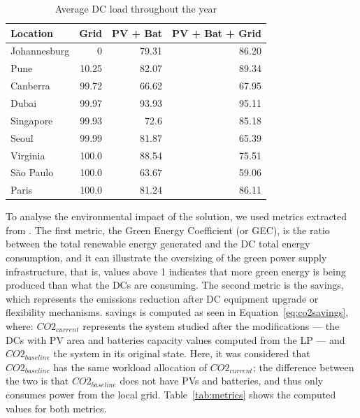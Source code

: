 \begin{table}[!ht]
  
  \caption{Average DC load throughout the year }\label{tab:dcutilization} \centering

  \begin{tabular}{|l|r|r|r|}
   \hline
    
  \textbf{Location} &   \textbf{Grid} & \textbf{PV + Bat} & \textbf{PV + Bat + Grid}  \\
  \hline
  Johannesburg & 0 & 79.31  & 86.20  \\
  \hline
  Pune  & 10.25 &  82.07 & 89.34   \\
  \hline
  Canberra  & 99.72 & 66.62 & 67.95 \\
  \hline
  Dubai   & 99.97 & 93.93 & 95.11   \\
  \hline
  Singapore & 99.93 & 72.6  & 85.18 \\
  \hline     
  Seoul    & 99.99 & 81.87 & 65.39      \\
  \hline
  Virginia   & 100.0 & 88.54 & 75.51 \\
  \hline
  São Paulo   & 100.0 & 63.67 & 59.06 \\
  \hline 
  Paris    & 100.0 & 81.24  &  86.11    \\
  \hline  

\end{tabular}  
\end{table}


To analyse the environmental impact of the solution, we used metrics extracted from \cite{reddy2017_metrics}. The first metric, the Green Energy Coefficient (or GEC), is the ratio between the total renewable energy generated and the DC total energy consumption, and it can illustrate the oversizing of the green power supply infrastructure, that is, values above 1 indicates that more green energy is being produced than what the DCs are consuming. The second metric is the  savings, which represents the emissions reduction after DC equipment upgrade or flexibility mechanisms.  savings is computed as seen in Equation~\ref{eq:co2savings}, where: $CO2_{current}$ represents the system studied after the modifications ---  the DCs with PV area and batteries capacity values computed from the LP  --- and $CO2_{baseline}$ the system in its original state. Here, it was considered that $CO2_{baseline}$ has the same workload allocation of  $CO2_{current}$; the difference between the two is that  $CO2_{baseline}$ does not have PVs and batteries, and thus only consumes power from the local grid. Table~\ref{tab:metrics} shows the computed values for both metrics. 


